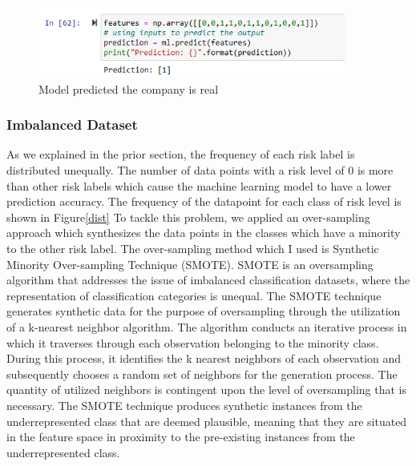 \documentclass{article}
\begin{document}
\begin{figure}[h]%
\centering

\includegraphics[width=0.9\textwidth]{pred.png}
\caption{Model predicted the company is real}\label{features_real}
\end{figure}




\subsubsection{Imbalanced Dataset}

As we explained in the prior section, the frequency of each risk label is distributed unequally. The number of data points with a risk level of 0 is more than other risk labels which cause the machine learning model to have a lower prediction accuracy. The frequency of the  datapoint for each class of risk level is shown in Figure\ref{dist} To tackle this problem, we applied an over-sampling approach which synthesizes the data points in the classes which have a minority to the other risk label. The over-sampling method which I used is Synthetic Minority Over-sampling Technique (SMOTE). SMOTE is an oversampling algorithm that addresses the issue of imbalanced classification datasets, where the representation of classification categories is unequal. The SMOTE technique generates synthetic data for the purpose of oversampling through the utilization of a k-nearest neighbor algorithm. The algorithm conducts an iterative process in which it traverses through each observation belonging to the minority class. During this process, it identifies the k nearest neighbors of each observation and subsequently chooses a random set of neighbors for the generation process. The quantity of utilized neighbors is contingent upon the level of oversampling that is necessary.
The SMOTE technique produces synthetic instances from the underrepresented class that are deemed plausible, meaning that they are situated in the feature space in proximity to the pre-existing instances from the underrepresented class.
\end{document}
